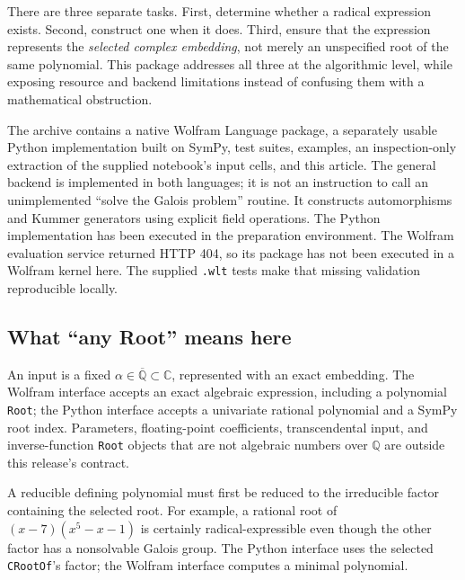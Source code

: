 \documentclass[11pt,a4paper]{article}
\newcommand{\Q}{\mathbb Q}
\newcommand{\C}{\mathbb C}
\newcommand{\code}[1]{\texttt{\small #1}}
\theoremstyle{definition}
\begin{document}
There are three separate tasks. First, determine whether a radical expression
exists. Second, construct one when it does. Third, ensure that the expression
represents the \emph{selected complex embedding}, not merely an unspecified root
of the same polynomial. This package addresses all three at the algorithmic
level, while exposing resource and backend limitations instead of confusing them
with a mathematical obstruction.

The archive contains a native Wolfram Language package, a separately usable
Python implementation built on SymPy, test suites, examples, an inspection-only
extraction of the supplied notebook's input cells, and this article. The general
backend is implemented in both languages; it is not an instruction to call an
unimplemented ``solve the Galois problem'' routine. It constructs automorphisms
and Kummer generators using explicit field operations. The Python implementation
has been executed in the preparation environment. The Wolfram evaluation service
returned HTTP 404, so its package has not been executed in a Wolfram kernel here.
The supplied \code{.wlt} tests make that missing validation reproducible locally.

\subsection{What ``any Root'' means here}
An input is a fixed $\alpha\in\overline{\Q}\subset\C$, represented with an exact
embedding. The Wolfram interface accepts an exact algebraic expression, including
a polynomial \texttt{Root}; the Python interface accepts a univariate rational
polynomial and a SymPy root index. Parameters, floating-point coefficients,
transcendental input, and inverse-function \texttt{Root} objects that are not
algebraic numbers over $\Q$ are outside this release's contract.

A reducible defining polynomial must first be reduced to the irreducible factor
containing the selected root. For example, a rational root of
$(x-7)(x^5-x-1)$ is certainly radical-expressible even though the other factor has
a nonsolvable Galois group. The Python interface uses the selected
\texttt{CRootOf}'s factor; the Wolfram interface computes a minimal polynomial.
\end{document}
